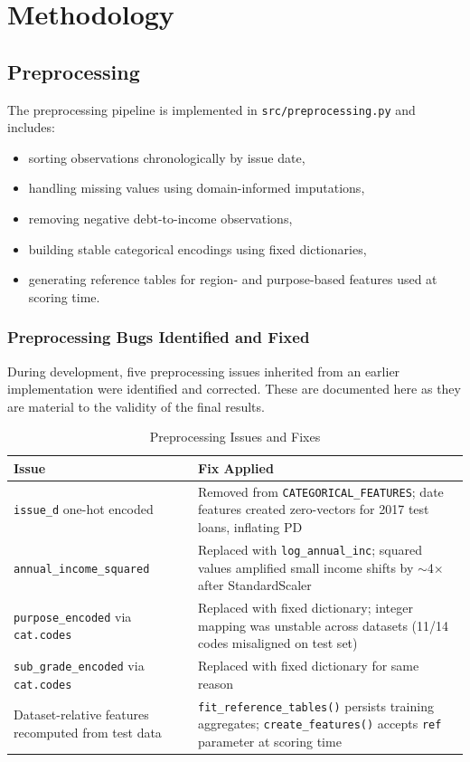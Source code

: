 \documentclass[12pt]{article}
\begin{document}
\section{Methodology}

\subsection{Preprocessing}

The preprocessing pipeline is implemented in \texttt{src/preprocessing.py} and includes:

\begin{itemize}[leftmargin=1.5em]
    \item sorting observations chronologically by issue date,
    \item handling missing values using domain-informed imputations,
    \item removing negative debt-to-income observations,
    \item building stable categorical encodings using fixed dictionaries,
    \item generating reference tables for region- and purpose-based features used at scoring time.
\end{itemize}

\subsubsection{Preprocessing Bugs Identified and Fixed}

During development, five preprocessing issues inherited from an earlier implementation were identified and corrected. These are documented here as they are material to the validity of the final results.

\begin{table}[H]
\centering
\caption{Preprocessing Issues and Fixes}
\begin{tabularx}{\textwidth}{>{\raggedright\arraybackslash}p{} X}
\toprule
Issue & Fix Applied \\
\midrule
\texttt{issue\_d} one-hot encoded & Removed from \texttt{CATEGORICAL\_FEATURES}; date features created zero-vectors for 2017 test loans, inflating PD \\
\texttt{annual\_income\_squared} & Replaced with \texttt{log\_annual\_inc}; squared values amplified small income shifts by $\sim$4$\times$ after StandardScaler \\
\texttt{purpose\_encoded} via \texttt{cat.codes} & Replaced with fixed dictionary; integer mapping was unstable across datasets (11/14 codes misaligned on test set) \\
\texttt{sub\_grade\_encoded} via \texttt{cat.codes} & Replaced with fixed dictionary for same reason \\
Dataset-relative features recomputed from test data & \texttt{fit\_reference\_tables()} persists training aggregates; \texttt{create\_features()} accepts \texttt{ref} parameter at scoring time \\
\bottomrule
\end{tabularx}
\end{table}
\end{document}
